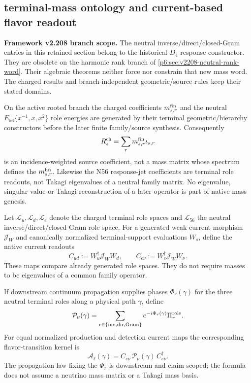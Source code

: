 \documentclass[12pt,a4paper]{article}
\begin{document}
\subsection{terminal-mass ontology and current-based flavor readout}
\label{p6:sec:v592-mass-ontology-flavor-readout}

\noindent\textbf{Framework v2.208 branch scope.}
The neutral inverse/direct/closed-Gram entries in this retained section
belong to the historical $D_4$ response constructor. They are obsolete
on the harmonic rank branch of \ref{p6:sec:v2208-neutral-rank-word}.
Their algebraic theorems neither force nor constrain that new mass word.
The charged results and branch-independent geometric/source rules keep
their stated domains.


\begin{theorem}
\label{p6:thm:v592-terminal-mass-no-backgeneration}
On the active rooted branch the charged coefficients $m_{s,r}^{\rm fin}$ and
the neutral $E_{56}\{x^{-1},x,x^2\}$ role energies are generated by their
terminal geometric/hierarchy constructors before the later finite
family/source synthesis.  Consequently
\[
 R_s^{\rm ch}=\sum_r m_{s,r}^{\rm fin}\iota_{s,r}
\]
is an incidence-weighted source coefficient, not a mass matrix whose spectrum
defines the $m_{s,r}^{\rm fin}$.  Likewise the N56 response-jet coefficients
are terminal role readouts, not Takagi eigenvalues of a neutral family matrix.
No eigenvalue, singular-value or Takagi reconstruction of a later operator is
part of native mass genesis.
\end{theorem}

\begin{definition}
\label{p6:def:v592-current-incidence}
Let $\mathscr L_u,\mathscr L_d,\mathscr L_e$ denote the charged terminal role
spaces and $\mathscr L_{56}$ the neutral inverse/direct/closed-Gram role space.
For a generated weak-current morphism $\mathscr J_W$ and canonically normalized
terminal-support evaluations $W_s$, define the native current readouts
\[
 C_{ud}:=W_u^\dagger\mathscr J_W W_d,
 \qquad
 C_{e\nu}:=W_e^\dagger\mathscr J_W W_\nu .
\]
These maps compare already generated role spaces.  They do not require masses
to be eigenvalues of a common family operator.
\end{definition}

\begin{definition}
\label{p6:def:v592-neutral-propagation-readout}
If downstream continuum propagation supplies phases $\Phi_r(\gamma)$ for the
three neutral terminal roles along a physical path $\gamma$, define
\[
 \mathcal P_\nu(\gamma)=\sum_{r\in\{\rm inv,dir,Gram\}}
 e^{-i\Phi_r(\gamma)}\Pi_r^{\rm role}.
\]
For equal normalized production and detection current maps the corresponding
flavor-transition kernel is
\[
 \mathcal A_\ell(\gamma)=C_{e\nu}\,\mathcal P_\nu(\gamma)\,C_{e\nu}^\dagger.
\]
The propagation law fixing the $\Phi_r$ is downstream and claim-scoped; the
formula does not assume a neutrino mass matrix or a Takagi mass basis.
\end{definition}
\end{document}
